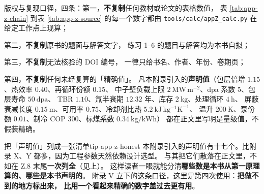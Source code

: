 版权与复现口径，四条：第一，\textbf{不复制}任何教材或论文的表格数值，
表 \ref{tab:app-z-chain} 到表 \ref{tab:app-z-source} 的每一个数字都由
\texttt{tools/\allowbreak{}calc/\allowbreak{}appZ\_calc.py} 在给定工作点上现算；

第二，\textbf{不复制}原书的题面与解答文字，
练习 1--6 的题目与解答均为本书自拟；

第三，\textbf{不复制}无法核验的 DOI 编号，
一律只给书名、作者、年份、卷期页；

第四，\textbf{不复制}任何未经复算的「精确值」。
凡本附录引入的\textbf{声明值}（包层倍增 $1.15$、热效率 $0.40$、再循环份额 $0.15$、
中子壁负载上限 $2\ \mathrm{MW\,m^{-2}}$、dpa 系数 $5$、包层寿命 $50\ \mathrm{dpa}$、
TBR $1.10$、氚半衰期 $12.32$ 年、库存 $2\ \mathrm{kg}$、处理循环 $4\ \mathrm{h}$、
屏蔽衰减长度 $0.15\ \mathrm{m}$、可用率 $0.75$、冷却剂比热 $5.2\ \mathrm{kJ\,kg^{-1}K^{-1}}$、
温升 $200\ \mathrm{K}$、泵份额 $0.01$、制冷 COP $300$、标煤系数 $0.34\ \mathrm{kg/kWh}$）
都在正文里写明是量级值，不假装精确。

\begin{tip}{把「声明值」列成一张清单}{tip-app-z-honest}
本附录引入的声明值有十七个。比附录 X、Y 都多，因为工程参数天然依赖设计选型。
与其把它们散落在正文里，不如在 Z.8 末尾\textbf{一次列全}（见上）。
这样读者一眼就能分清\textbf{哪些数是本书从第一原理算的、哪些是本书声明的}。
附录 V 立下的这条口径，这里是第四次使用：\textbf{把做不到的地方标出来，
比用一个看起来精确的数字盖过去更有用}。
\end{tip}
\endgroup
